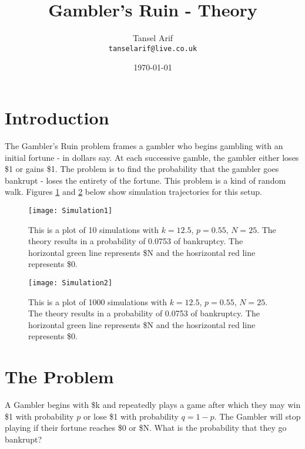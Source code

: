 \documentclass{article}
\title{Gambler's Ruin - Theory} %
\author{Tansel Arif\\ \texttt{tanselarif@live.co.uk}} %
\date{\today} %
\begin{document}
\maketitle %


\section*{Introduction} %

The Gambler's Ruin problem frames a gambler who begins gambling with an initial fortune - in dollars say. At each successive gamble, the gambler either loses \$1 or gains \$1. The problem is to find the probability that the gambler goes bankrupt - loses the entirety of the fortune. This problem is a kind of random walk. Figures \ref{fig:sim1} and \ref{fig:sim2} below show simulation trajectories for this setup.

\begin{figure}[r]
    \centering
    \texttt{[image: Simulation1]}
    \caption{This is a plot of 10 simulations with $k = 12.5$, $p = 0.55$, $N = 25$. The theory results in a probability of 0.0753 of bankruptcy. The horizontal green line represents \$N and the hosrizontal red line represents \$0.}
    \label{fig:sim1}
\end{figure}

\begin{figure}[r]
    \centering
    \texttt{[image: Simulation2]}
    \caption{This is a plot of 1000 simulations with $k = 12.5$, $p = 0.55$, $N = 25$. The theory results in a probability of 0.0753 of bankruptcy. The horizontal green line represents \$N and the hosrizontal red line represents \$0.}
    \label{fig:sim2}
\end{figure}

\section{The Problem} %

A Gambler begins with \$k and repeatedly plays a game after which they may win \$1 with probability $p$ or lose \$1 with probability $q=1-p$. The Gambler will stop playing if their fortune reaches \$0 or \$N. What is the probability that they go bankrupt?
\end{document}
